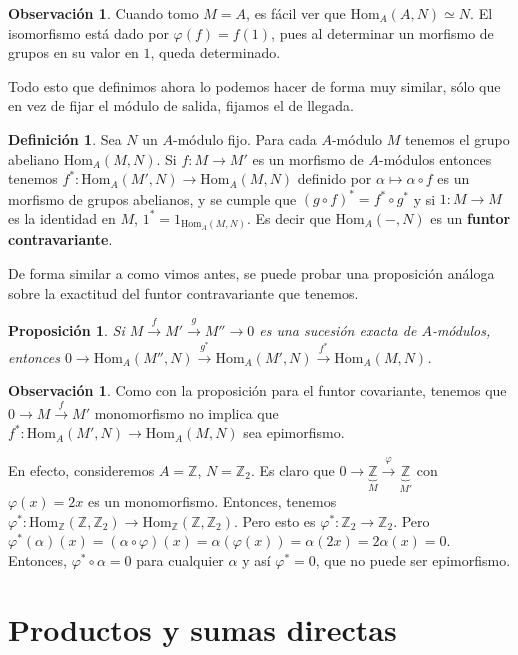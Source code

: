 \documentclass[12pt]{book}
\newtheorem{prop}[teo]{Proposición}
\theoremstyle{definition}
\newtheorem{obs}[teo]{Observación}
\newtheorem{defn}[teo]{Definición}
\newcommand{\ZZ}{\mathbb{Z}}      %
\renewcommand{\hom}{\mathrm{Hom}}
\begin{document}
\begin{obs}
Cuando tomo $M=A$, es fácil ver que $\hom_A(A,N)\simeq N$. El isomorfismo está dado por $\varphi(f)=f(1)$, pues al determinar un morfismo de grupos en su valor en $1$, queda determinado.
\end{obs}

Todo esto que definimos ahora lo podemos hacer de forma muy similar, sólo que en vez de fijar el módulo de salida, fijamos el de llegada.

\begin{defn}
Sea $N$ un $A$-módulo fijo. Para cada $A$-módulo $M$ tenemos el grupo abeliano $\hom_A(M,N)$. Si $f:M\to M'$ es un morfismo de $A$-módulos entonces tenemos $f^*:\hom_A(M',N)\to\hom_A(M,N)$ definido por $\alpha\mapsto \alpha\circ f$ es un morfismo de grupos abelianos, y se cumple que $(g\circ f)^* = f^*\circ g^*$ y si $1:M\to M$ es la identidad en $M$, $1^* = 1_{\hom_A(M,N)}$. Es decir que $\hom_A(-,N)$ es un \textbf{funtor contravariante}.
\end{defn}

De forma similar a como vimos antes, se puede probar una proposición análoga sobre la exactitud del funtor contravariante que tenemos.
\begin{prop}
Si $M\stackrel{f}{\longrightarrow} M'\stackrel{g}{\longrightarrow} M''\longrightarrow 0$ es una sucesión exacta de $A$-módulos, entonces $0\longrightarrow \hom_A(M'',N)\stackrel{g^*}{\longrightarrow}\hom_{A}(M',N)\stackrel{f^*}{\longrightarrow} \hom_A(M,N)$.
\end{prop}

\begin{obs}
Como con la proposición para el funtor covariante, tenemos que $0\longrightarrow M\stackrel{f}{\longrightarrow}M'$ monomorfismo no implica que $f^*:\hom_A(M',N)\to\hom_A(M,N)$ sea epimorfismo.

En efecto, consideremos $A=\ZZ$, $N=\ZZ_2$. Es claro que $0\longrightarrow \underbrace{\ZZ}_{M}\stackrel{\varphi}{\longrightarrow} \underbrace{\ZZ}_{M'}$ con $\varphi(x)=2x$ es un monomorfismo. Entonces, tenemos $\varphi^*:\hom_\ZZ(\ZZ,\ZZ_2)\to \hom_\ZZ(\ZZ,\ZZ_2)$. Pero esto es $\varphi^*:\ZZ_2\to \ZZ_2$. Pero $\varphi^*(\alpha)(x) = (\alpha\circ\varphi)(x) = \alpha(\varphi(x))=\alpha(2x) = 2\alpha(x)=0$. Entonces, $\varphi^*\circ\alpha=0$ para cualquier $\alpha$ y así $\varphi^*=0$, que no puede ser epimorfismo.

\end{obs}

\section{Productos y sumas directas}
\end{document}
